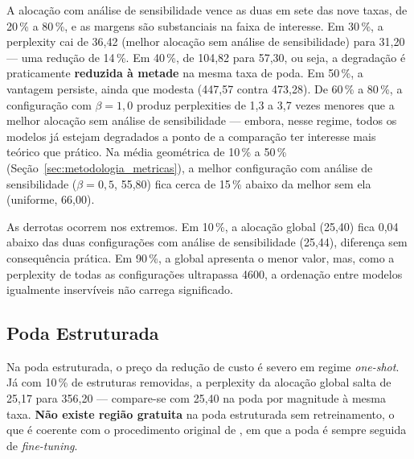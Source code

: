 A alocação com análise de sensibilidade vence as duas em sete das nove taxas, de 20\,\%
a 80\,\%, e as margens são substanciais na faixa de interesse. Em 30\,\%, a perplexity
cai de 36,42 (melhor alocação sem análise de sensibilidade) para 31,20 --- uma redução de
14\,\%. Em 40\,\%, de 104,82 para 57,30, ou seja, a degradação é praticamente
\textbf{reduzida à metade} na mesma taxa de poda. Em 50\,\%, a vantagem persiste, ainda
que modesta (447,57 contra 473,28). De 60\,\% a 80\,\%, a configuração com
$\beta = 1{,}0$ produz perplexities de 1,3 a 3,7 vezes menores que a melhor alocação sem
análise de sensibilidade --- embora, nesse regime, todos os modelos já estejam degradados
a ponto de a comparação ter interesse mais teórico que prático. Na média geométrica de
10\,\% a 50\,\% (Seção~\ref{sec:metodologia_metricas}), a melhor configuração com análise
de sensibilidade ($\beta = 0{,}5$, 55,80) fica cerca de 15\,\% abaixo da melhor sem ela
(uniforme, 66,00).

As derrotas ocorrem nos extremos. Em 10\,\%, a alocação global (25,40) fica 0,04 abaixo
das duas configurações com análise de sensibilidade (25,44), diferença sem consequência
prática. Em 90\,\%, a global apresenta o menor valor, mas, como a perplexity de todas as
configurações ultrapassa 4600, a ordenação entre modelos igualmente inservíveis não
carrega significado.

\subsection{Poda Estruturada}\label{subsec:aloc_estruturada}\label{sec:res_estruturada}

\begin{table}[htb]
\centering
\caption{Perplexity da poda estruturada, sem retreinamento, nas quatro alocações; a taxa
de poda é a fração de estruturas removidas. Em negrito, o menor valor de cada taxa.
$\beta$ é o expoente de intensidade da Equação~\ref{eq:alocacao_dev}, que controla o
quanto a alocação segue o perfil de sensibilidade: com $\beta = 1{,}0$ o perfil é seguido
integralmente, e com $\beta = 0{,}5$ as diferenças entre camadas são atenuadas.}
\label{tab:comp_estruturada}
\small

\end{table}

Na poda estruturada, o preço da redução de custo é severo em regime \textit{one-shot}. Já
com 10\,\% de estruturas removidas, a perplexity da alocação global salta de 25,17 para
356,20 --- compare-se com 25,40 na poda por magnitude à mesma taxa. \textbf{Não existe
região gratuita} na poda estruturada sem retreinamento, o que é coerente com o
procedimento original de , em que a poda é sempre seguida de
\textit{fine-tuning}.

